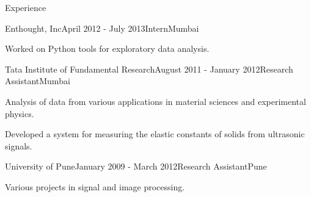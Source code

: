 \documentclass{resume} %
\begin{document}
\begin{rSection}{Experience}
\begin{rSubsection}{Enthought, Inc}{April 2012 - July 2013}{Intern}{Mumbai}
\item Worked on Python tools for exploratory data analysis.
\end{rSubsection}

\begin{rSubsection}{Tata Institute of Fundamental Research}{August 2011 -
    January 2012}{Research Assistant}{Mumbai}
\item Analysis of data from various applications in material sciences and
    experimental physics.
\item Developed a system for measuring the elastic constants of solids from
    ultrasonic signals.
\end{rSubsection}

\begin{rSubsection}{University of Pune}{January 2009 - March 2012}{Research
    Assistant}{Pune}
\item Various projects in signal and image processing.
\end{rSubsection}

\end{rSection}
\end{document}
